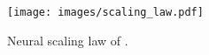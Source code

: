 \begin{figure}[t]
    \centering
    \texttt{[image: images/scaling\_law.pdf]}
    \vspace{-.3cm}
    \caption{Neural scaling law of \ourmethod.}
    \label{fig:scaling}
    \vspace{-.6cm}
\end{figure}